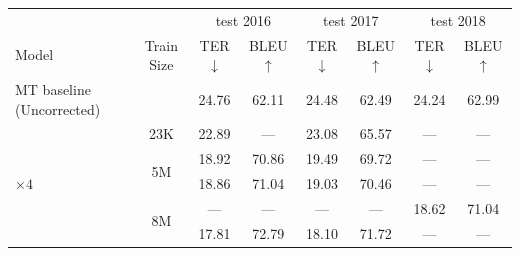 \begin{landscape}
  \begin{table}[t]
    \centering
    \begin{tabular}{lccccccc}
      \toprule
                                                       &                & \multicolumn{2}{c}{test 2016} &
      \multicolumn{2}{c}{test 2017}                    &
      \multicolumn{2}{c}{test 2018}                                                                                                      \\
      \cmidrule{3-4} \cmidrule{5-6}  \cmidrule{7-8}
      Model                                            & Train Size     & TER$\downarrow$               & BLEU$\uparrow$ &
      TER$\downarrow$                                  & BLEU$\uparrow$ & TER$\downarrow$               & BLEU$\uparrow$                 \\
      \midrule
      MT baseline (Uncorrected)                        &                &
      24.76                                            & 62.11          & 24.48                         & 62.49          & 24.24 & 62.99 \\
      \midrule
      \citet{berard2017lig}                            &
      \multicolumn{1}{c}{23K}                          &
      22.89                                            & ---            & 23.08                         & 65.57          & ---   & ---   \\
      \midrule
      \citet{junczys2018ms}                            &
      \multicolumn{1}{c}{\multirow{2}{*}{5M}}          &
      18.92                                            & 70.86          & 19.49                         & 69.72          & ---   & ---   \\
      \citet{junczys2018ms}$\times 4$                  &
      \multicolumn{1}{c}{}                             &
      18.86                                            & 71.04          & 19.03                         & 70.46          & ---   & ---   \\
      \midrule
      \citet{tebbifakhr2018multi}                      &
      \multicolumn{1}{c}{\multirow{3}{*}{8M}}          &
      ---                                              & ---            & ---                           & ---            & 18.62 & 71.04 \\
      \citet{junczys2018ms}                            &
      \multicolumn{1}{c}{}                             &
      17.81                                            & 72.79          & 18.10                         & 71.72          & ---   & ---   \\

\end{tabular}
\end{table}
\end{landscape}
